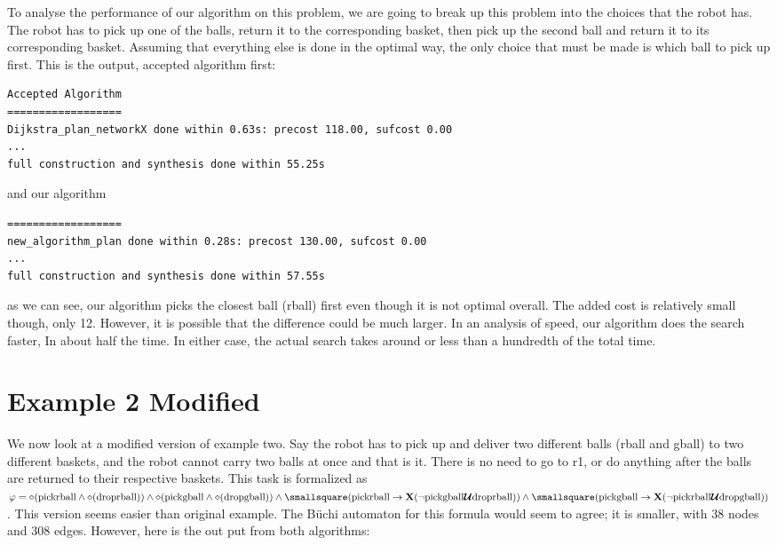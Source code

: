 To analyse the performance of our algorithm on this problem, we are going to break up this problem into the choices that the robot has. The robot has to pick up one of the balls, return it to the corresponding basket, then pick up the second ball and return it to its corresponding basket. Assuming that everything else is done in the optimal way, the only choice that must be made is which ball to pick up first. This is the output, accepted algorithm first:

\begingroup
\fontsize{9pt}{12pt}\selectfont
\begin{lstlisting}
Accepted Algorithm
==================
Dijkstra_plan_networkX done within 0.63s: precost 118.00, sufcost 0.00
...
full construction and synthesis done within 55.25s 
\end{lstlisting}
\endgroup
and our algorithm
\begingroup
\fontsize{9pt}{12pt}\selectfont
\begin{lstlisting}
==================
new_algorithm_plan done within 0.28s: precost 130.00, sufcost 0.00
...
full construction and synthesis done within 57.55s 
\end{lstlisting}
\endgroup
as we can see, our algorithm picks the closest ball (rball) first even though it is not optimal overall. The added cost is relatively small though, only 12. However, it is possible that the difference could be much larger. In an analysis of speed, our algorithm does the search faster, In about half the time. In either case, the actual search takes around or less than a hundredth of the total time.

\section{Example 2 Modified}
We now look at a modified version of example two. Say the robot has to pick up and deliver two different balls (rball and gball) to two different baskets, and the robot cannot carry two balls at once and that is it. There is no need to go to r1, or do anything after the balls are returned to their respective baskets. This task is formalized as $\varphi = \diamond (\text{pickrball} \wedge \diamond (\text{droprball})) \wedge \diamond(\text{pickgball} \wedge \diamond (\text{dropgball})) \wedge \smallsquare (\text{pickrball} \rightarrow \textbf{X}(\neg \text{pickgball} \U \text{droprball})) \wedge \smallsquare (\text{pickgball} \rightarrow \\ \textbf{X} (\neg \text{pickrball} \U \text{dropgball}))$. This version seems easier than original example. The B\"uchi automaton for this formula would seem to agree; it is smaller, with 38 nodes and 308 edges. However, here is the out put from both algorithms:

